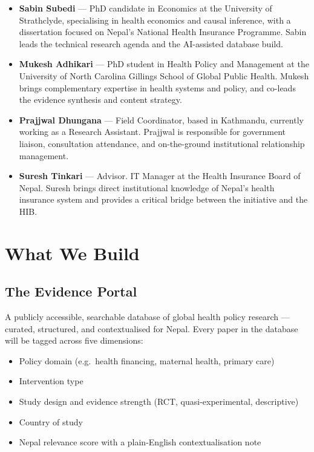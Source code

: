 \documentclass[11pt, a4paper]{article}
\begin{document}
\begin{itemize}
  \item \textbf{Sabin Subedi} --- PhD candidate in Economics at the University of Strathclyde, specialising in health economics and causal inference, with a dissertation focused on Nepal's National Health Insurance Programme. Sabin leads the technical research agenda and the AI-assisted database build.

  \item \textbf{Mukesh Adhikari} --- PhD student in Health Policy and Management at the University of North Carolina Gillings School of Global Public Health. Mukesh brings complementary expertise in health systems and policy, and co-leads the evidence synthesis and content strategy.

  \item \textbf{Prajjwal Dhungana} --- Field Coordinator, based in Kathmandu, currently working as a Research Assistant. Prajjwal is responsible for government liaison, consultation attendance, and on-the-ground institutional relationship management.

  \item \textbf{Suresh Tinkari} --- Advisor. IT Manager at the Health Insurance Board of Nepal. Suresh brings direct institutional knowledge of Nepal's health insurance system and provides a critical bridge between the initiative and the HIB.
\end{itemize}

\section{What We Build}

\subsection{The Evidence Portal}

A publicly accessible, searchable database of global health policy research --- curated, structured, and contextualised for Nepal. Every paper in the database will be tagged across five dimensions:

\begin{itemize}
  \item Policy domain (e.g.\ health financing, maternal health, primary care)
  \item Intervention type
  \item Study design and evidence strength (RCT, quasi-experimental, descriptive)
  \item Country of study
  \item Nepal relevance score with a plain-English contextualisation note
\end{itemize}
\end{document}
